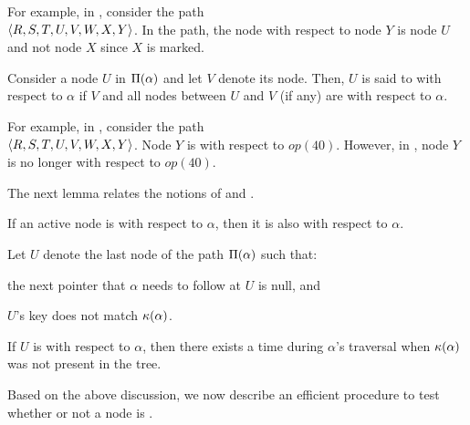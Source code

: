 For example, in , consider the path \\ $\langle R, S, T, U, V, W, X, Y \rangle$. In the path, the \mycritical{} node with respect to node $Y$ 
is node $U$ and not node $X$ since $X$ is marked.  


\begin{definition}
\label{def:safe}
Consider a node $U$ in $\Pi(\alpha)$ and let $V$ denote its \mycritical{} node. 
Then, $U$ is said to \emph{\mysafe{}} with respect to $\alpha$
if $V$ and all \myanchor{} nodes between $U$ and $V$ (if any) are \myconsistent{} with respect to $\alpha$.
\end{definition}

For example, in , consider the path \\ $\langle R, S, T, U, V, W, X, Y \rangle$. Node $Y$ is \mysafe{} with respect to $op(40)$. However, in , node $Y$ is no longer \mysafe{} with respect to $op(40)$.

The next lemma relates the notions of \mylegality{} and \mysafety{}.

\begin{lemma}[\mysafety{} $\implies$ \mylegality{}]
\label{lem:safe:legal}
If an active node is \mysafe{} with respect to  $\alpha$, then it is also \mylegal{} with respect to $\alpha$.
\end{lemma}

\begin{lemma}
\label{lem:last|safe:not|present}
Let $U$ denote the last node of the path $\Pi(\alpha)$ such that:
\begin{enumerate*}[label=(\roman*)]
\item the next pointer that $\alpha$ needs to follow at $U$ is null, and
\item $U$'s key does not match $\kappa(\alpha)$.
\end{enumerate*}
If $U$ is \mysafe{} with respect to $\alpha$, 
then there exists a time during $\alpha$'s traversal when $\kappa(\alpha)$ was not present in the tree.
\end{lemma}

Based on the above discussion, we now describe an efficient procedure to test whether or not a node is \mysafe{}. 

